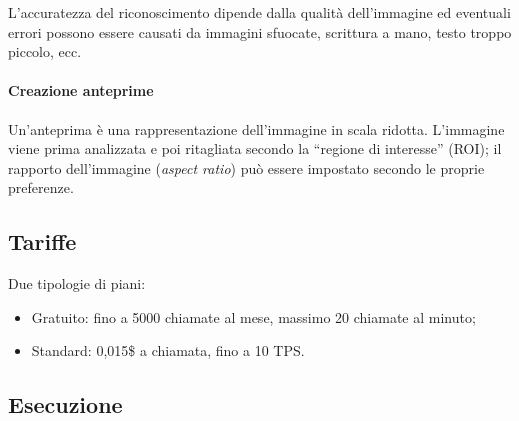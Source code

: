 \documentclass[fleqn,a4paper,11pt]{report}
\begin{document}
L'accuratezza del riconoscimento dipende dalla qualità dell'immagine ed eventuali errori possono essere causati da immagini sfuocate, scrittura a mano, testo troppo piccolo, ecc.
   
\paragraph{Creazione anteprime} Un'anteprima è una rappresentazione dell'immagine in scala ridotta. L'immagine viene prima analizzata e poi ritagliata secondo la ``regione di interesse'' (ROI); il rapporto dell'immagine (\textit{aspect ratio}) può essere impostato secondo le proprie preferenze.


\subsection{Tariffe} Due tipologie di piani:
\begin{itemize}
\item Gratuito: fino a 5000 chiamate al mese, massimo 20 chiamate al minuto;
\item Standard: 0,015\$ a chiamata, fino a 10 TPS.
\end{itemize}


\subsection{Esecuzione}


\paragraph{} 
\end{document}
